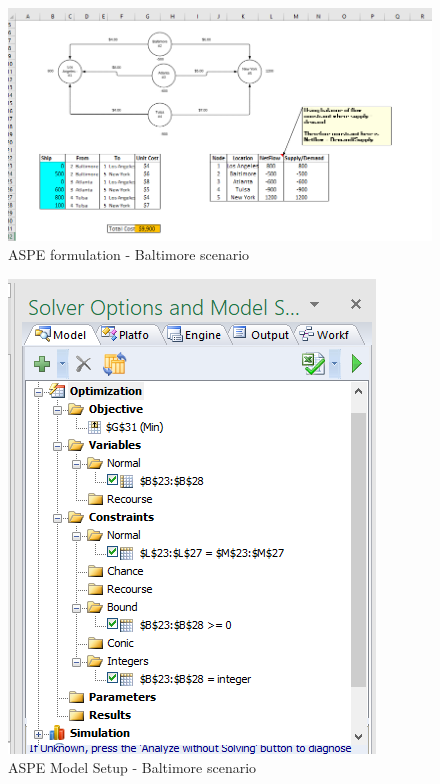 \documentclass[]{article}
\begin{document}
\begin{figure}[h]

{\centering \includegraphics{Figures/Homework3/p1a} 

}

\caption{ASPE formulation - Baltimore scenario}\label{fig:unnamed-chunk-2}
\end{figure}

\begin{figure}[h]

{\centering \includegraphics{Figures/Homework3/modelp1a} 

}

\caption{ASPE Model Setup - Baltimore scenario}\label{fig:unnamed-chunk-3}
\end{figure}
\end{document}
